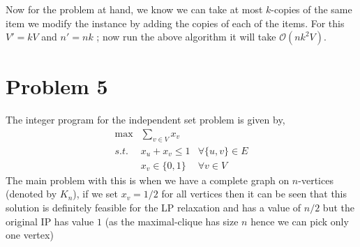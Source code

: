 \documentclass{article}
\numberwithin{equation}{section}
\numberwithin{theorem}{section}
\numberwithin{lemma}{section}
\newcommand{\bigOh}[1]{\mathcal{O}\left(#1\right)}
\begin{document}
Now for the problem at hand, we know we can take at most $k$-copies of the same item we modify the instance by adding the copies of each of the items. For this $V' = kV$ and $n' = nk$ ; now run the above algorithm it will take $\bigOh{nk^2V}$. 
\newpage 
\section{Problem 5}
The integer program for the independent set problem is given by, 
\begin{equation}
    \begin{array}{ccc}
        \max& \sum_{v \in V} x_v&  \\
        s.t.& x_u + x_v \le 1 &\forall \{u,v\}\in E\\
        & x_v \in \{0, 1\}& \forall v \in V
    \end{array}
\end{equation}
The main problem with this is when we have a complete graph on $n$-vertices (denoted by $K_n$), if we set $x_v=1/2$ for all vertices then it can be seen that this solution is definitely feasible for the LP relaxation and has a value of $n/2$ but the original IP has value $1$ (as the maximal-clique has size $n$ hence we can pick only one vertex)
\end{document}
